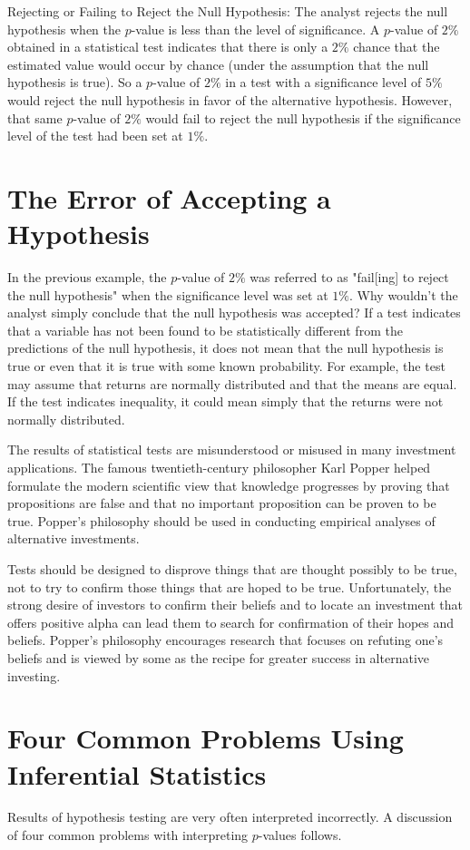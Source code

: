 \documentclass[11pt]{article}
\begin{document}
Rejecting or Failing to Reject the Null Hypothesis: The analyst rejects the null hypothesis when the $p$-value is less than the level of significance. A $p$-value of $2 \%$ obtained in a statistical test indicates that there is only a $2 \%$ chance that the estimated value would occur by chance (under the assumption that the null hypothesis is true). So a $p$-value of $2 \%$ in a test with a significance level of $5 \%$ would reject the null hypothesis in favor of the alternative hypothesis. However, that same $p$-value of $2 \%$ would fail to reject the null hypothesis if the significance level of the test had been set at $1 \%$.

\section*{The Error of Accepting a Hypothesis}
In the previous example, the $p$-value of $2 \%$ was referred to as "fail[ing] to reject the null hypothesis" when the significance level was set at $1 \%$. Why wouldn't the analyst simply conclude that the null hypothesis was accepted? If a test indicates that a variable has not been found to be statistically different from the predictions of the null hypothesis, it does not mean that the null hypothesis is true or even that it is true with some known probability. For example, the test may assume that returns are normally distributed and that the means are equal. If the test indicates inequality, it could mean simply that the returns were not normally distributed.

The results of statistical tests are misunderstood or misused in many investment applications. The famous twentieth-century philosopher Karl Popper helped formulate the modern scientific view that knowledge progresses by proving that propositions are false and that no important proposition can be proven to be true. Popper's philosophy should be used in conducting empirical analyses of alternative investments.

Tests should be designed to disprove things that are thought possibly to be true, not to try to confirm those things that are hoped to be true. Unfortunately, the strong desire of investors to confirm their beliefs and to locate an investment that offers positive alpha can lead them to search for confirmation of their hopes and beliefs. Popper's philosophy encourages research that focuses on refuting one's beliefs and is viewed by some as the recipe for greater success in alternative investing.

\section*{Four Common Problems Using Inferential Statistics}
Results of hypothesis testing are very often interpreted incorrectly. A discussion of four common problems with interpreting $p$-values follows.
\end{document}
